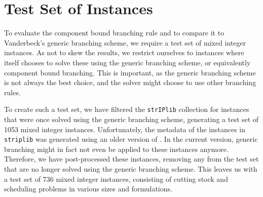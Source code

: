 \section{Test Set of Instances}\label{sec:evaluation_testset}
To evaluate the component bound branching rule and to compare it to Vanderbeck's generic branching scheme, we require a test set of mixed integer instances. As not to skew the results, we restrict ourselves to instances where \GCG{} itself chooses to solve these using the generic branching scheme, or equivalently component bound branching. This is important, as the generic branching scheme is not always the best choice, and the solver might choose to use other branching rules.

To create such a test set, we have filtered the \texttt{strIPlib} \cite{strIPlib} collection for instances that were once solved using the generic branching scheme, generating a test set of 1053 mixed integer instances. Unfortunately, the metadata of the instances in \texttt{striplib} was generated using an older version of \GCG{}. In the current version, generic branching might in fact not even be applied to these instances anymore. Therefore, we have post-processed these instances, removing any from the test set that are no longer solved using the generic branching scheme. This leaves us with a test set of 736 mixed integer instances, consisting of cutting stock and scheduling problems in various sizes and formulations.
